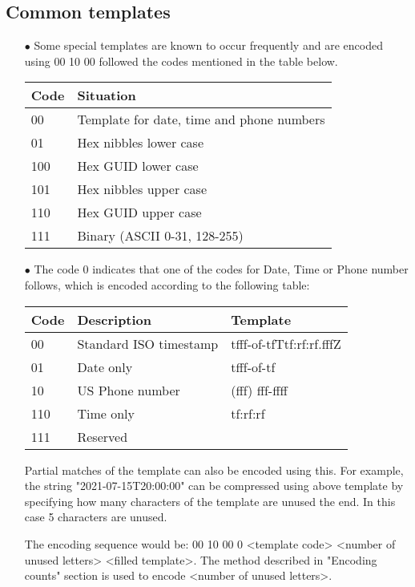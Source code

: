 \documentclass[]{article}
\begin{document}
	\subsection{Common templates}
	\begin{itemize}
		\item[$\bullet$] Some special templates are known to occur frequently and are encoded using 00 10 00 followed the codes mentioned in the table below.
		\item[] 
		\begin{tabular}{ | l | l |} \hline
			\textbf{Code} & \textbf{Situation} \\ \hline
			00 & Template for date, time and phone numbers \\ \hline
			01 & Hex nibbles lower case \\ \hline
			100 & Hex GUID lower case \\ \hline
			101 & Hex nibbles upper case \\ \hline
			110 & Hex GUID upper case \\ \hline
			111 & Binary (ASCII 0-31, 128-255) \\ \hline
		\end{tabular}
		\item[$\bullet$] The code 0 indicates that one of the codes for Date, Time or Phone number follows, which is encoded according to the following table:
		\item[] 
		\begin{tabular}{ | l | l | l |} \hline
			\textbf{Code} & \textbf{Description} & \textbf{Template} \\ \hline
			00 & Standard ISO timestamp & tfff-of-tfTtf:rf:rf.fffZ \\ \hline
			01 & Date only & tfff-of-tf \\ \hline
			10 & US Phone number & (fff) fff-ffff \\ \hline
			110 & Time only & tf:rf:rf \\ \hline
			111 & Reserved \\ \hline
		\end{tabular}
		\item[]Partial matches of the template can also be encoded using this. For example, the string "2021-07-15T20:00:00" can be compressed using above template by specifying how many characters of the template are unused the end. In this case 5 characters are unused.
		\item[]The encoding sequence would be: 00 10 00 0 <template code> <number of unused letters> <filled template>. The method described in "Encoding counts" section is used to encode <number of unused letters>.

\end{itemize}
\end{document}
